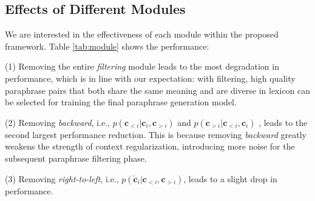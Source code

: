 \documentclass[11pt,a4paper]{article}
\begin{document}
\begin{table}[t]
    \centering
    \small
    \caption{The effect of percentage of selected candidates for candidate reranking on Wikianswers.}
    \label{tab:candidate}
\end{table} 



\subsection{Effects of Different Modules}
We are interested in the effectiveness of each module within the proposed framework. 
Table \ref{tab:module} shows the performance:  

(1) Removing the entire {\it filtering} module leads to the most degradation in performance, which is in line with our expectation: with filtering, high quality paraphrase pairs that both share the same meaning and are diverse in lexicon can be selected for training the final paraphrase generation model.

(2) Removing {\it backward}, i.e., $p(\bm{c}_{<i}|\bm{c}_i,\bm{c}_{>i})$  and  $p(\bm{c}_{>i}|\bm{c}_{<i},\bm{c}_i)$ , leads to the second largest performance reduction. This is because removing {\it backward} greatly weakens the strength of context regularization, introducing more noise for the subsequent paraphrase filtering phase.

(3) Removing {\it right-to-left}, i.e., $p(\overleftarrow{\bm{c}}_i|\bm{c}_{<i},\bm{c}_{>i})$, leads to a slight drop in performance.
\end{document}
